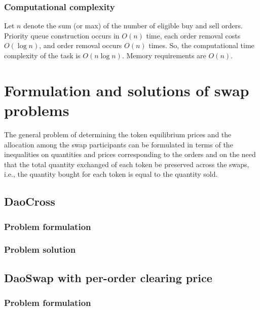 \documentclass[11pt, reqno]{amsart}
\theoremstyle{definition}
\theoremstyle{remark}
\begin{document}
\subsubsection{Computational complexity}
Let $n$ denote the sum (or max) of the number of eligible buy and sell orders.
Priority queue construction occurs in $O(n)$ time, each order removal costs
$O(\log n)$, and order removal occurs $O(n)$ times. So, the computational
time complexity of the task is $O(n \log n)$. Memory requirements are $O(n)$.

\section{Formulation and solutions of swap problems}
The general problem of determining the token equilibrium prices and the
allocation among the swap participants can be formulated in terms of the
inequalities on quantities and prices corresponding to the orders and on the
need that the total quantity exchanged of each token be preserved across the
swaps, i.e., the quantity bought for each token is equal to the quantity sold.

\subsection{DaoCross}

\subsubsection{Problem formulation}

\subsubsection{Problem solution}

\subsection{DaoSwap with per-order clearing price}

\subsubsection{Problem formulation}
\end{document}

